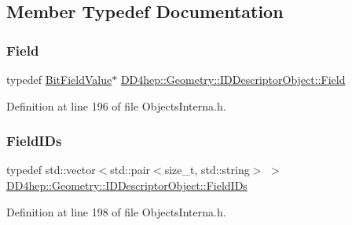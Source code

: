\subsection{Member Typedef Documentation}
\hypertarget{class_d_d4hep_1_1_geometry_1_1_i_d_descriptor_object_acd5cae904f0db0ed0805ef1077ce2111}{}\label{class_d_d4hep_1_1_geometry_1_1_i_d_descriptor_object_acd5cae904f0db0ed0805ef1077ce2111} 
\subsubsection{\texorpdfstring{Field}{Field}}
{\footnotesize\ttfamily typedef \hyperlink{class_d_d4hep_1_1_d_d_segmentation_1_1_bit_field_value}{Bit\+Field\+Value}$\ast$ \hyperlink{class_d_d4hep_1_1_geometry_1_1_i_d_descriptor_object_acd5cae904f0db0ed0805ef1077ce2111}{D\+D4hep\+::\+Geometry\+::\+I\+D\+Descriptor\+Object\+::\+Field}}



Definition at line 196 of file Objects\+Interna.\+h.

\hypertarget{class_d_d4hep_1_1_geometry_1_1_i_d_descriptor_object_aa9d779170fd1d2221d27f3b63df6d6d4}{}\label{class_d_d4hep_1_1_geometry_1_1_i_d_descriptor_object_aa9d779170fd1d2221d27f3b63df6d6d4} 
\subsubsection{\texorpdfstring{Field\+I\+Ds}{FieldIDs}}
{\footnotesize\ttfamily typedef std\+::vector$<$std\+::pair$<$size\+\_\+t, std\+::string$>$ $>$ \hyperlink{class_d_d4hep_1_1_geometry_1_1_i_d_descriptor_object_aa9d779170fd1d2221d27f3b63df6d6d4}{D\+D4hep\+::\+Geometry\+::\+I\+D\+Descriptor\+Object\+::\+Field\+I\+Ds}}



Definition at line 198 of file Objects\+Interna.\+h.

\hypertarget{class_d_d4hep_1_1_geometry_1_1_i_d_descriptor_object_a784af03aa08575a914c2399b45eae052}{}\label{class_d_d4hep_1_1_geometry_1_1_i_d_descriptor_object_a784af03aa08575a914c2399b45eae052} 
